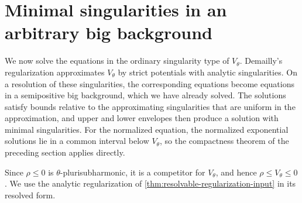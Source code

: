 \section{Minimal singularities in an arbitrary big background}
\label{sec:big-minimal-existence}

We now solve the equations in the ordinary singularity type of $V_\theta$. Demailly's regularization approximates $V_\theta$ by strict potentials with analytic singularities. On a resolution of these singularities, the corresponding equations become equations in a semipositive big background, which we have already solved. The solutions satisfy bounds relative to the approximating singularities that are uniform in the approximation, and upper and lower envelopes then produce a solution with minimal singularities. For the normalized equation, the normalized exponential solutions lie in a common interval below $V_\theta$, so the compactness theorem of the preceding section applies directly.

Since $\rho\leq0$ is $\theta$-plurisubharmonic, it is a competitor for $V_\theta$, and hence $\rho\leq V_\theta\leq0$. We use the analytic regularization of \cref{thm:resolvable-regularization-input} in its resolved form.

